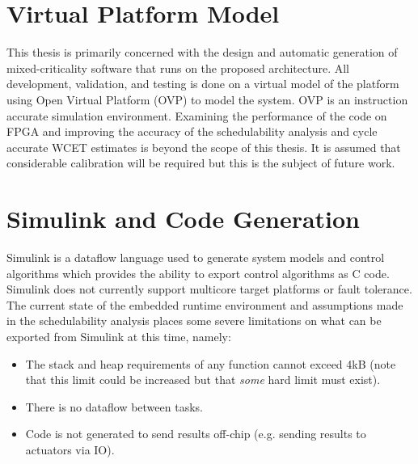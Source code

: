 
 
\section{Virtual Platform Model}

	This thesis is primarily concerned with the design and automatic generation of mixed-criticality software that runs on the proposed architecture. 
	All development, validation, and testing is done on a virtual model of the platform using Open Virtual Platform (OVP) to model the system. OVP is an instruction accurate simulation environment. 
	Examining the performance of the code on FPGA and improving the accuracy of the schedulability analysis and cycle accurate WCET estimates is beyond the scope of this thesis. 
	It is assumed that considerable calibration will be required but this is the subject of future work.

\section{Simulink and Code Generation}

	Simulink is a dataflow language used to generate system models and control algorithms which provides the ability to export control algorithms as C code. 
	Simulink does not currently support multicore target platforms or fault tolerance. 
	The current state of the embedded runtime environment and assumptions made in the schedulability analysis places some severe limitations on what can be exported from Simulink at this time, namely:
\begin{itemize}
  \item The stack and heap requirements of any function cannot exceed 4kB (note that this limit could be increased but that \emph{some} hard limit must exist).
  \item There is no dataflow between tasks.
  \item Code is not generated to send results off-chip (e.g. sending results to actuators via IO).
\end{itemize}



